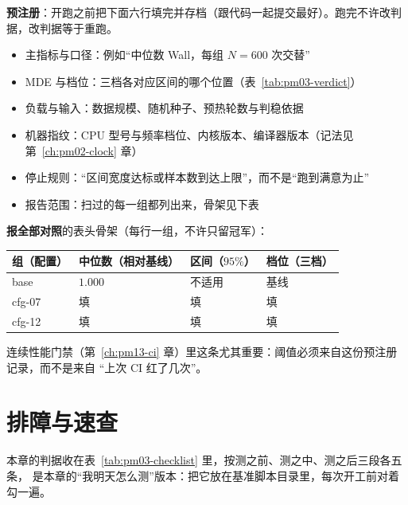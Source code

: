 \documentclass[12pt,a4paper,fontset=fandol]{ctexbook}
\newcommand{\Lang}[1]{\textsf{#1}}
\newcommand{\MWall}{\Lang{Wall}}
\newcommand{\Mx}[1]{\textsf{#1}}
\begin{document}
\begin{bestpractice}[title={预注册判据与``报全部对照''的写法模板}, label={box:pm03-prereg}]
\textbf{预注册}：开跑之前把下面六行填完并存档（跟代码一起提交最好）。跑完不许改判据，改判据等于重跑。
\begin{itemize}
  \item 主指标与口径：例如``中位数 \MWall，每组 $N=600$ 次交替''
  \item \Mx{MDE} 与档位：三档各对应区间的哪个位置（表~\ref{tab:pm03-verdict}）
  \item 负载与输入：数据规模、随机种子、预热轮数与判稳依据
  \item 机器指纹：CPU 型号与频率档位、内核版本、编译器版本（记法见第~\ref{ch:pm02-clock} 章）
  \item 停止规则：``区间宽度达标或样本数到达上限''，而不是``跑到满意为止''
  \item 报告范围：扫过的每一组都列出来，骨架见下表
\end{itemize}
\textbf{报全部对照}的表头骨架（每行一组，不许只留冠军）：
\begin{center}
\begin{tabular}{>{\raggedright\arraybackslash}p{} >{\raggedright\arraybackslash}p{} >{\raggedright\arraybackslash}p{} >{\raggedright\arraybackslash}p{}}
\toprule
组（配置） & 中位数（相对基线） & 区间（$95\%$） & 档位（三档） \\
\midrule
base & $1.000$ & 不适用 & 基线 \\
cfg-07 & 填 & 填 & 填 \\
cfg-12 & 填 & 填 & 填 \\
\bottomrule
\end{tabular}
\end{center}
连续性能门禁（第~\ref{ch:pm13-ci} 章）里这条尤其重要：阈值必须来自这份预注册记录，而不是来自
``上次 CI 红了几次''。
\end{bestpractice}

\section{排障与速查}
\label{sec:pm03-trouble}

本章的判据收在表~\ref{tab:pm03-checklist} 里，按测之前、测之中、测之后三段各五条，
是本章的``我明天怎么测''版本：把它放在基准脚本目录里，每次开工前对着勾一遍。
\end{document}
